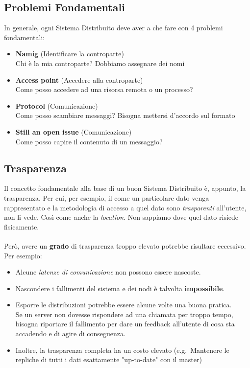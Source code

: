 \documentclass[12pt, a4paper]{article}
\begin{document}
    \subsection{Problemi Fondamentali}
    In generale, ogni Sistema Distribuito deve aver a che fare con 4 problemi fondamentali:
    \begin{itemize}
        \item \textbf{Namig} (Identificare la controparte)
        \\Chi è la mia controparte? Dobbiamo assegnare dei nomi

        \item \textbf{Access point} (Accedere alla controparte)
        \\Come posso accedere ad una risorsa remota o un processo?

        \item \textbf{Protocol} (Comunicazione)
        \\Come posso scambiare messaggi? Bisogna mettersi d'accordo sul formato

        \item \textbf{Still an open issue} (Comunicazione)
        \\Come posso capire il contenuto di un messaggio?
    \end{itemize}

    \subsection{Trasparenza}
    Il concetto fondamentale alla base di un buon Sistema Distribuito è, appunto,
    la trasparenza. Per cui, per esempio, il come un particolare dato venga rappresentato
    e la metodologia di accesso a quel dato sono \textit{trasparenti} all'utente, non li vede.
    Così come anche la \textit{location}. Non sappiamo dove quel dato risiede fisicamente.
    \\\\Però, avere un \textbf{grado} di trasparenza troppo elevato potrebbe risultare eccessivo.
    Per esempio:
    \begin{itemize}
        \item Alcune \textit{latenze di comunicazione} non possono essere nascoste.
        \item Nascondere i fallimenti del sistema e dei nodi è talvolta \textbf{impossibile}.
        \item Esporre le distribuzioni potrebbe essere alcune volte una buona pratica.
        \\Se un server non dovesse rispondere ad una chiamata per troppo tempo, bisogna riportare il fallimento
        per dare un feedback all'utente di cosa sta accadendo e di agire di conseguenza.
        \item Inoltre, la trasparenza completa ha un costo elevato 
        (e.g.\ Mantenere le repliche di tutti i dati esattamente "up-to-date" con il master)
    \end{itemize}
\end{document}
